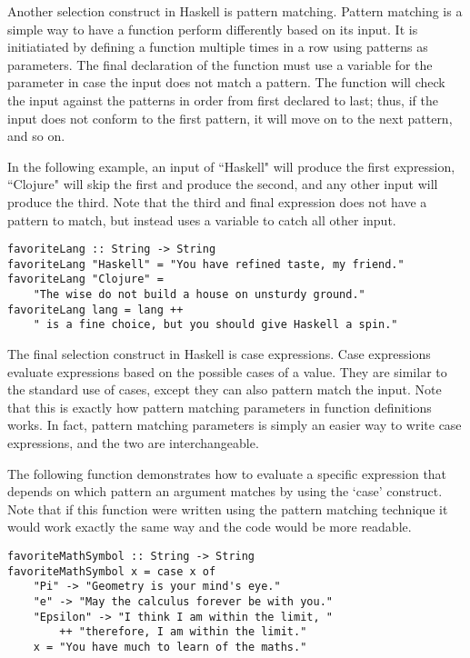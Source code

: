 \documentclass[titlepage,12pt]{article}
\begin{document}
Another selection construct in Haskell is pattern matching. Pattern matching is a simple way to have a function perform differently based on its input. It is initiatiated by defining a function multiple times in a row using patterns as parameters. The final declaration of the function must use a variable for the parameter in case the input does not match a pattern. The function will check the input against the patterns in order from first declared to last; thus, if the input does not conform to the first pattern, it will move on to the next pattern, and so on. 

In the following example, an input of ``Haskell" will produce the first expression, ``Clojure" will skip the first and produce the second, and any other input will produce the third. Note that the third and final expression does not have a pattern to match, but instead uses a variable to catch all other input. 

\begin{verbatim}
favoriteLang :: String -> String
favoriteLang "Haskell" = "You have refined taste, my friend."
favoriteLang "Clojure" = 
    "The wise do not build a house on unsturdy ground."
favoriteLang lang = lang ++ 
    " is a fine choice, but you should give Haskell a spin."
\end{verbatim}

The final selection construct in Haskell is case expressions. Case expressions evaluate expressions based on the possible cases of a value. They are similar to the standard use of cases, except they can also pattern match the input. Note that this is exactly how pattern matching parameters in function definitions works. In fact, pattern matching parameters is simply an easier way to write case expressions, and the two are interchangeable. 

The following function demonstrates how to evaluate a specific expression that depends on which pattern an argument matches by using the `case' construct. Note that if this function were written using the pattern matching technique it would work exactly the same way and the code would be more readable. 

\begin{verbatim}
favoriteMathSymbol :: String -> String
favoriteMathSymbol x = case x of
    "Pi" -> "Geometry is your mind's eye."
    "e" -> "May the calculus forever be with you."
    "Epsilon" -> "I think I am within the limit, "
        ++ "therefore, I am within the limit."
    x = "You have much to learn of the maths."
\end{verbatim}
\end{document}
